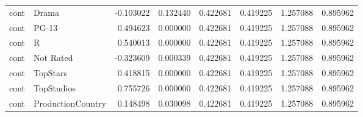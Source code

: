 \begin{tabular}{llrrrrrr}
cont & Drama & -0.103022 & 0.132440 & 0.422681 & 0.419225 & 1.257088 & 0.895962 \\
cont & PG-13 & 0.494623 & 0.000000 & 0.422681 & 0.419225 & 1.257088 & 0.895962 \\
cont & R & 0.540013 & 0.000000 & 0.422681 & 0.419225 & 1.257088 & 0.895962 \\
cont & Not Rated & -0.323609 & 0.000339 & 0.422681 & 0.419225 & 1.257088 & 0.895962 \\
cont & TopStars & 0.418815 & 0.000000 & 0.422681 & 0.419225 & 1.257088 & 0.895962 \\
cont & TopStudios & 0.755726 & 0.000000 & 0.422681 & 0.419225 & 1.257088 & 0.895962 \\
cont & ProductionCountry & 0.148498 & 0.030098 & 0.422681 & 0.419225 & 1.257088 & 0.895962 \\
\bottomrule
\end{tabular}
